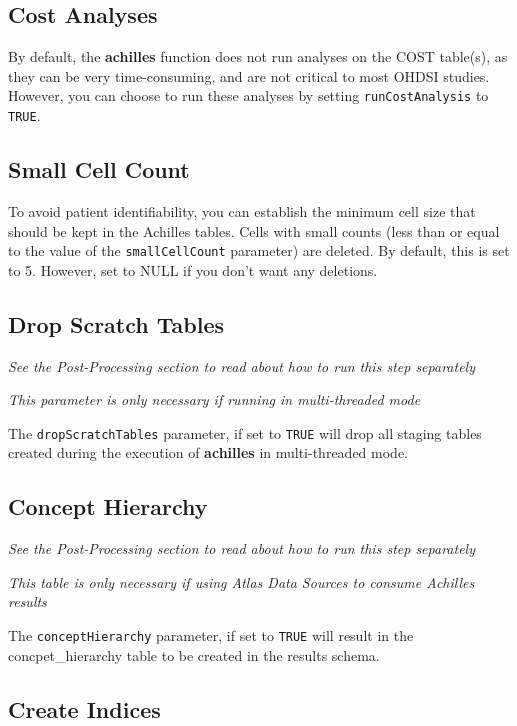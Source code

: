 \documentclass[]{article}
\begin{document}
\subsection{Cost Analyses}\label{cost-analyses}

By default, the \textbf{achilles} function does not run analyses on the
COST table(s), as they can be very time-consuming, and are not critical
to most OHDSI studies. However, you can choose to run these analyses by
setting \texttt{runCostAnalysis} to \texttt{TRUE}.

\subsection{Small Cell Count}\label{small-cell-count}

To avoid patient identifiability, you can establish the minimum cell
size that should be kept in the Achilles tables. Cells with small counts
(less than or equal to the value of the \texttt{smallCellCount}
parameter) are deleted. By default, this is set to 5. However, set to
NULL if you don't want any deletions.

\subsection{Drop Scratch Tables}\label{drop-scratch-tables}

\emph{See the Post-Processing section to read about how to run this step
separately}

\emph{This parameter is only necessary if running in multi-threaded
mode}

The \texttt{dropScratchTables} parameter, if set to \texttt{TRUE} will
drop all staging tables created during the execution of
\textbf{achilles} in multi-threaded mode.

\subsection{Concept Hierarchy}\label{concept-hierarchy}

\emph{See the Post-Processing section to read about how to run this step
separately}

\emph{This table is only necessary if using Atlas Data Sources to
consume Achilles results}

The \texttt{conceptHierarchy} parameter, if set to \texttt{TRUE} will
result in the concpet\_hierarchy table to be created in the results
schema.

\subsection{Create Indices}\label{create-indices}
\end{document}
